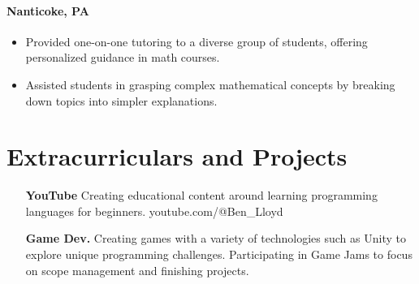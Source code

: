 \documentclass{article}
\begin{document}
\paragraph{Nanticoke, PA}
\begin{itemize}
  \itemsep0em 
  \item Provided one-on-one tutoring to a diverse group of students, offering personalized guidance in math courses.
  \item Assisted students in grasping complex mathematical concepts by breaking down topics into simpler explanations.
\end{itemize}

\section{Extracurriculars and Projects}
\begin{itemize}
  \itemsep0em 
  \item[\bfseries YouTube] Creating educational content around learning programming languages for beginners. youtube.com/@Ben\_Lloyd
  \item[\bfseries Game Dev.] Creating games with a variety of technologies such as Unity to explore unique programming challenges. Participating in Game Jams to focus on scope management and finishing projects.
\end{itemize}

\thispagestyle{empty}
\end{document}
